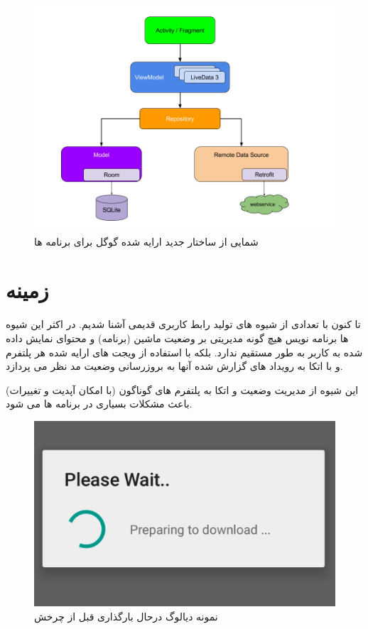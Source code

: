 \documentclass{CSICC2020}
\begin{document}
\begin{figure}[h]
\includegraphics[width=\linewidth]{Images/android-arch}
\caption{شمایی از ساختار جدید ارایه شده گوگل برای برنامه ها}
\label{fig:XAML}
\end{figure}

\section{زمینه}
\label{Context}
تا کنون با تعدادی از شیوه های تولید رابط کاربری قدیمی آشنا شدیم. در اکثر این شیوه ها برنامه نویس هیچ گونه مدیریتی بر وضعیت ماشین (برنامه) و محتوای نمایش داده شده به کاربر به طور مستقیم ندارد. بلکه با استفاده از ویجت های ارایه شده هر پلتفرم و با اتکا به رویداد های گزارش شده آنها به بروزرسانی وضعیت مد نظر می پردازد.

این شیوه از مدیریت وضعیت و اتکا به پلتفرم های گوناگون (با امکان آپدیت و تغییرات) باعث مشکلات بسیاری در برنامه ها می شود.

\begin{figure}[h!]
\includegraphics[width=\linewidth]{Images/loading}
\caption{نمونه دیالوگ درحال بارگذاری قبل از چرخش}
\label{fig:Loading}
\end{figure}
\end{document}
